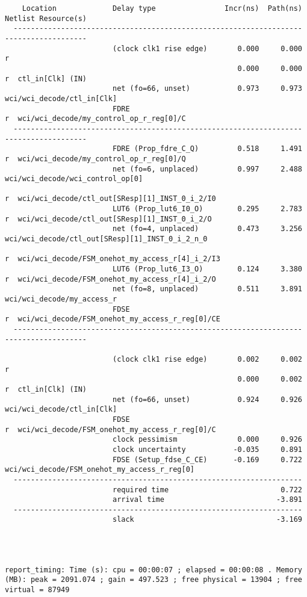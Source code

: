\documentclass{article}
\begin{document}
\begin{lstlisting}
    Location             Delay type                Incr(ns)  Path(ns)    Netlist Resource(s)
  -------------------------------------------------------------------    -------------------
                         (clock clk1 rise edge)       0.000     0.000 r  
                                                      0.000     0.000 r  ctl_in[Clk] (IN)
                         net (fo=66, unset)           0.973     0.973    wci/wci_decode/ctl_in[Clk]
                         FDRE                                         r  wci/wci_decode/my_control_op_r_reg[0]/C
  -------------------------------------------------------------------    -------------------
                         FDRE (Prop_fdre_C_Q)         0.518     1.491 r  wci/wci_decode/my_control_op_r_reg[0]/Q
                         net (fo=6, unplaced)         0.997     2.488    wci/wci_decode/wci_control_op[0]
                                                                      r  wci/wci_decode/ctl_out[SResp][1]_INST_0_i_2/I0
                         LUT6 (Prop_lut6_I0_O)        0.295     2.783 r  wci/wci_decode/ctl_out[SResp][1]_INST_0_i_2/O
                         net (fo=4, unplaced)         0.473     3.256    wci/wci_decode/ctl_out[SResp][1]_INST_0_i_2_n_0
                                                                      r  wci/wci_decode/FSM_onehot_my_access_r[4]_i_2/I3
                         LUT6 (Prop_lut6_I3_O)        0.124     3.380 r  wci/wci_decode/FSM_onehot_my_access_r[4]_i_2/O
                         net (fo=8, unplaced)         0.511     3.891    wci/wci_decode/my_access_r
                         FDSE                                         r  wci/wci_decode/FSM_onehot_my_access_r_reg[0]/CE
  -------------------------------------------------------------------    -------------------

                         (clock clk1 rise edge)       0.002     0.002 r  
                                                      0.000     0.002 r  ctl_in[Clk] (IN)
                         net (fo=66, unset)           0.924     0.926    wci/wci_decode/ctl_in[Clk]
                         FDSE                                         r  wci/wci_decode/FSM_onehot_my_access_r_reg[0]/C
                         clock pessimism              0.000     0.926    
                         clock uncertainty           -0.035     0.891    
                         FDSE (Setup_fdse_C_CE)      -0.169     0.722    wci/wci_decode/FSM_onehot_my_access_r_reg[0]
  -------------------------------------------------------------------
                         required time                          0.722    
                         arrival time                          -3.891    
  -------------------------------------------------------------------
                         slack                                 -3.169    




report_timing: Time (s): cpu = 00:00:07 ; elapsed = 00:00:08 . Memory (MB): peak = 2091.074 ; gain = 497.523 ; free physical = 13904 ; free virtual = 87949
\end{lstlisting}
\end{document}
